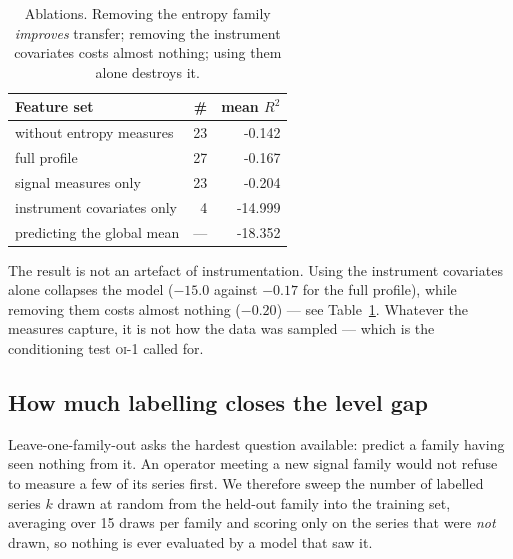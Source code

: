 \documentclass[11pt,a4paper]{article}
\newcommand{\num}[1]{#1}
\newcommand{\oi}[1]{\textsc{oi-#1}}
\begin{document}
\begin{table}[t]
\centering
\caption{Ablations. Removing the entropy family \emph{improves} transfer;
removing the instrument covariates costs almost nothing; using them alone
destroys it.}
\label{tab:ablation}
\small
\begin{tabular}{lrr}
\toprule
Feature set & \# & mean \(R^2\) \\
\midrule
without entropy measures   & 23 & \num{-0.142} \\
full profile               & 27 & \num{-0.167} \\
signal measures only       & 23 & \num{-0.204} \\
instrument covariates only & 4  & \num{-14.999} \\
\midrule
predicting the global mean & --- & \num{-18.352} \\
\bottomrule
\end{tabular}
\end{table}


The result is not an artefact of instrumentation. Using the instrument covariates
alone collapses the model (\(-15.0\) against \(-0.17\) for the full profile),
while removing them costs almost nothing (\(-0.20\)) --- see
Table~\ref{tab:ablation}. Whatever the
measures capture, it is not how the data was sampled --- which is the
conditioning test \oi{1} called for.

\subsection{How much labelling closes the level gap}
\label{sec:fewshot}

Leave-one-family-out asks the hardest question available: predict a family
having seen nothing from it. An operator meeting a new signal family would not
refuse to measure a few of its series first. We therefore sweep the number of
labelled series \(k\) drawn at random from the held-out family into the training
set, averaging over \num{15} draws per family and scoring only on the series
that were \emph{not} drawn, so nothing is ever evaluated by a model that saw it.
\end{document}
